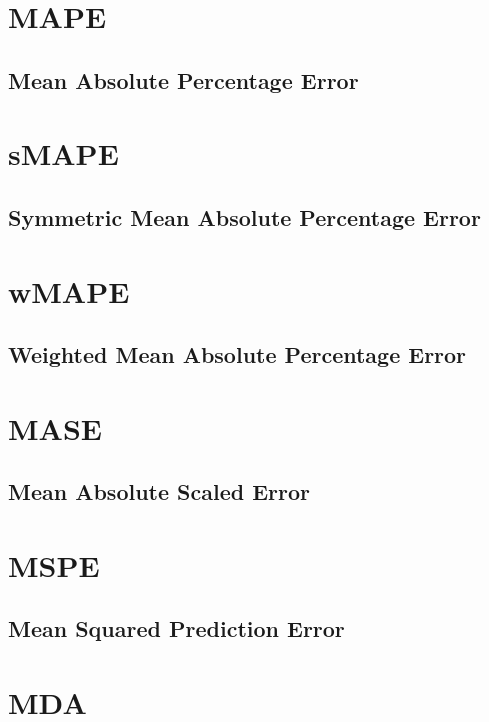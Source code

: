 \clearpage
\thispagestyle{customstyle}
\section{MAPE}
\subsection{Mean Absolute Percentage Error}

\clearpage
\thispagestyle{customstyle}
\section{sMAPE}
\subsection{Symmetric Mean Absolute Percentage Error}

\clearpage
\thispagestyle{customstyle}
\section{wMAPE}
\subsection{Weighted Mean Absolute Percentage Error}

\clearpage
\thispagestyle{customstyle}
\section{MASE}
\subsection{Mean Absolute Scaled Error}

\clearpage
\thispagestyle{customstyle}
\section{MSPE}
\subsection{Mean Squared Prediction Error}

\clearpage
\thispagestyle{customstyle}
\section{MDA}
